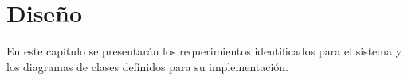\chapter{Diseño}
En este capítulo se presentarán los requerimientos identificados para el sistema
y los diagramas de clases definidos para su implementación.




